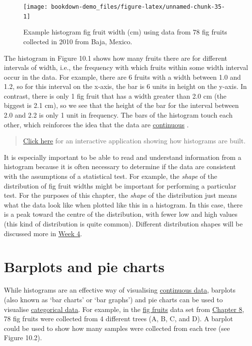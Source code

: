 \documentclass[
]{scrbook}
\begin{document}
\begin{figure}
\texttt{[image: bookdown-demo\_files/figure-latex/unnamed-chunk-35-1]} \caption{Example histogram fig fruit width (cm) using data from 78 fig fruits collected in 2010 from Baja, Mexico.}\label{fig:unnamed-chunk-35}
\end{figure}

The histogram in Figure 10.1 shows how many fruits there are for different intervals of width, i.e., the frequency with which fruits within some width interval occur in the data.
For example, there are 6 fruits with a width between 1.0 and 1.2, so for this interval on the x-axis, the bar is 6 units in height on the y-axis.
In contrast, there is only 1 fig fruit that has a width greater than 2.0 cm (the biggest is 2.1 cm), so we see that the height of the bar for the interval between 2.0 and 2.2 is only 1 unit in frequency.
The bars of the histogram touch each other, which reinforces the idea that the data are \protect\hyperlink{Chapter_5}{continuous} \citep{Dytham2011, Sokal1995}.

\begin{quote}
\href{https://bradduthie.shinyapps.io/build_histogram/}{Click here} for an interactive application showing how histograms are built.
\end{quote}

It is especially important to be able to read and understand information from a histogram because it is often necessary to determine if the data are consistent with the assumptions of a statistical test.
For example, the \emph{shape} of the distribution of fig fruit widths might be important for performing a particular test.
For the purposes of this chapter, the \emph{shape} of the distribution just means what the data look like when plotted like this in a histogram.
In this case, there is a peak toward the centre of the distribution, with fewer low and high values (this kind of distribution is quite common).
Different distribution shapes will be discussed more in \protect\hyperlink{Week4}{Week 4}.

\hypertarget{barplots-and-pie-charts}{%
\section{Barplots and pie charts}\label{barplots-and-pie-charts}}

While histograms are an effective way of visualising \protect\hyperlink{Chapter_5}{continuous data}, barplots (also known as `bar charts' or `bar graphs') and pie charts can be used to visualise \protect\hyperlink{Chapter_5}{categorical data}.
For example, in the \href{https://raw.githubusercontent.com/bradduthie/SCIU4T4/main/data/fig_fruits.csv}{fig fruits} data set from \protect\hyperlink{Chapter_8}{Chapter 8}, 78 fig fruits were collected from 4 different trees (A, B, C, and D).
A barplot could be used to show how many samples were collected from each tree (see Figure 10.2).
\end{document}
